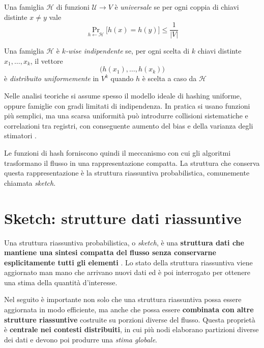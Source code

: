 \begin{definition}
Una famiglia $\mathcal{H}$ di funzioni $\mathcal{U} \to V$ è \emph{universale} se
per ogni coppia di chiavi distinte $x \neq y$ vale
\[
\Pr_{h \leftarrow \mathcal{H}}\bigl[h(x)=h(y)\bigr] \le \frac{1}{|V|}
\]
\cite{Carter_Wegman_1979}
\end{definition}

\begin{definition}
Una famiglia $\mathcal{H}$ è \emph{$k$-wise indipendente} se, per ogni scelta di $k$ chiavi distinte
$x_1,\dots,x_k$, il vettore
\[
\bigl(h(x_1),\dots,h(x_k)\bigr)
\]
è \textit{distribuito uniformemente} in $V^k$ quando $h$ è scelta a caso da $\mathcal{H}$
\cite{Vadhan_Mitzenmacher_2007}
\end{definition}

Nelle analisi teoriche si assume spesso il modello ideale di hashing uniforme, oppure famiglie
con gradi limitati di indipendenza. In pratica si usano funzioni più semplici, ma una scarsa uniformità
può introdurre collisioni sistematiche e correlazioni tra registri, con conseguente aumento del bias
e della varianza degli stimatori \cite{Vadhan_Mitzenmacher_2007,UniformHashing_Pagh_2007}.

Le funzioni di hash forniscono quindi il meccanismo con cui gli algoritmi trasformano il flusso
in una rappresentazione compatta. La struttura che conserva questa rappresentazione
è la struttura riassuntiva probabilistica, comunemente chiamata \emph{sketch}.

\section{Sketch: strutture dati riassuntive}
\label{sec:sketch}
Una struttura riassuntiva probabilistica, o \emph{sketch}, è una \textbf{struttura dati che mantiene
una sintesi compatta del flusso senza conservarne esplicitamente tutti gli elementi} \cite{Cormode_2017}.
Lo stato della struttura riassuntiva viene aggiornato man mano che arrivano nuovi dati ed è poi interrogato
per ottenere una stima della quantità d'interesse.

Nel seguito è importante non solo che una struttura riassuntiva possa essere aggiornata in modo efficiente,
ma anche che possa essere \textbf{combinata con altre strutture riassuntive} costruite su porzioni diverse del flusso.
Questa proprietà è \textbf{centrale nei contesti distribuiti}, in cui più nodi elaborano partizioni diverse dei dati
e devono poi produrre una \textit{stima globale}.

